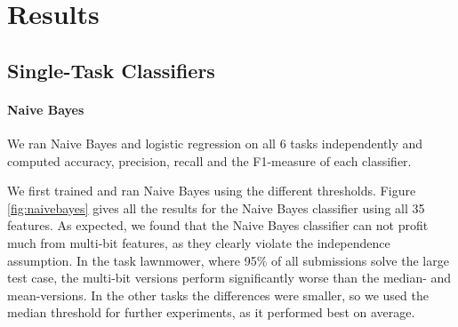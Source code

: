 \section{Results}
\subsection{Single-Task Classifiers}
\paragraph*{Naive Bayes}
We ran Naive Bayes and logistic regression on all 6 tasks independently and computed accuracy, precision, recall and the F1-measure of each classifier. 

We first trained and ran Naive Bayes using the different thresholds. Figure \ref{fig:naivebayes} gives all the results for the Naive Bayes classifier using all 35 features. As expected, we found that the Naive Bayes classifier can not profit much from multi-bit features, as they clearly violate the independence assumption. In the task lawnmower, where 95\% of all submissions solve the large test case, the multi-bit versions perform significantly worse than the median- and mean-versions. In the other tasks the differences were smaller, so we used the median threshold for further experiments, as it performed best on average.

